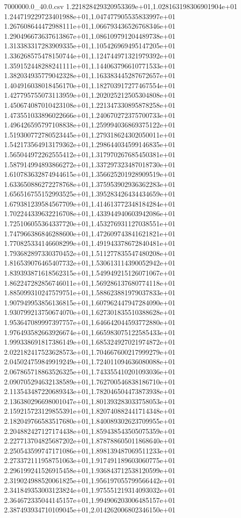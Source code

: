 \begin{filecontents*}{7000000.0_40.0.csv}
1.221828429320953369e+01,1.028163198306901904e+01
1.244719229723401988e+01,1.047477905535833997e+01
1.267608644472988111e+01,1.066793436526768346e+01
1.290496673637613867e+01,1.086109791204489738e+01
1.313383317283909335e+01,1.105426969495147205e+01
1.336268575478150744e+01,1.124744971321979392e+01
1.359152448288241111e+01,1.144063796610771533e+01
1.382034935779042328e+01,1.163383445287672657e+01
1.404916038018456170e+01,1.182703917277467554e+01
1.427795755073113959e+01,1.202025212505304808e+01
1.450674087010423108e+01,1.221347330895878258e+01
1.473551033896022666e+01,1.240670272375700733e+01
1.496426595797108838e+01,1.259994036869375122e+01
1.519300772780523445e+01,1.279318624302050011e+01
1.542173564913179362e+01,1.298644034599146835e+01
1.565044972262555412e+01,1.317970267685450381e+01
1.587914994893866272e+01,1.337297323487018730e+01
1.610783632874944615e+01,1.356625201928909519e+01
1.633650886272278768e+01,1.375953902936362283e+01
1.656516755152993525e+01,1.395283426434434659e+01
1.679381239584567709e+01,1.414613772348184284e+01
1.702244339632216708e+01,1.433944940603942086e+01
1.725106055364337720e+01,1.453276931127038551e+01
1.747966386846288600e+01,1.472609743841621821e+01
1.770825334146608299e+01,1.491943378672840481e+01
1.793682897330370452e+01,1.511277835547480208e+01
1.816539076465407732e+01,1.530613114390052942e+01
1.839393871618562315e+01,1.549949215126071067e+01
1.862247282856746011e+01,1.569286137680774118e+01
1.885099310247579751e+01,1.588623881979037833e+01
1.907949953856136815e+01,1.607962447947284090e+01
1.930799213750674070e+01,1.627301835510388628e+01
1.953647089997397757e+01,1.646642044593772880e+01
1.976493582663926674e+01,1.665983075122585433e+01
1.999338691817386149e+01,1.685324927021974872e+01
2.022182417523628573e+01,1.704667600217999279e+01
2.045024759849919249e+01,1.724011094636080088e+01
2.067865718863526325e+01,1.743355410201093036e+01
2.090705294632138589e+01,1.762700546838186710e+01
2.113543487220689343e+01,1.782046504473873938e+01
2.136380296698001047e+01,1.801393283033758053e+01
2.159215723129855391e+01,1.820740882441714348e+01
2.182049766583517680e+01,1.840089302623709955e+01
2.204882427127174438e+01,1.859438543505075359e+01
2.227713704825687202e+01,1.878788605011868640e+01
2.250543599747171086e+01,1.898139487069511233e+01
2.273372111958751063e+01,1.917491189603060775e+01
2.296199241526915458e+01,1.936843712538120599e+01
2.319024988520061825e+01,1.956197055799566442e+01
2.341849353003123824e+01,1.975551219314093032e+01
2.364672335044145157e+01,1.994906203006485157e+01
2.387493934710109045e+01,2.014262006802346150e+01

\end{filecontents*}
